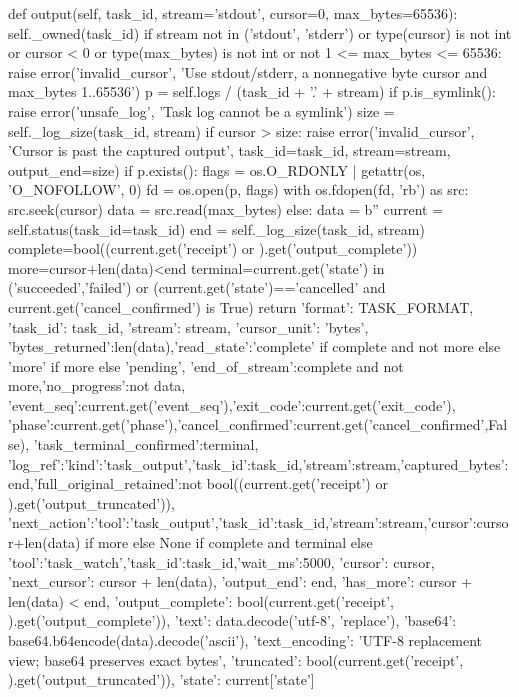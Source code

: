     def output(self, task_id, stream='stdout', cursor=0, max_bytes=65536):
        self._owned(task_id)
        if stream not in ('stdout', 'stderr') or type(cursor) is not int or cursor < 0 or type(max_bytes) is not int or not 1 <= max_bytes <= 65536:
            raise error('invalid_cursor', 'Use stdout/stderr, a nonnegative byte cursor and max_bytes 1..65536')
        p = self.logs / (task_id + '.' + stream)
        if p.is_symlink():
            raise error('unsafe_log', 'Task log cannot be a symlink')
        size = self._log_size(task_id, stream)
        if cursor > size:
            raise error('invalid_cursor', 'Cursor is past the captured output', task_id=task_id, stream=stream, output_end=size)
        if p.exists():
            flags = os.O_RDONLY | getattr(os, 'O_NOFOLLOW', 0)
            fd = os.open(p, flags)
            with os.fdopen(fd, 'rb') as src:
                src.seek(cursor)
                data = src.read(max_bytes)
        else:
            data = b''
        current = self.status(task_id=task_id)
        end = self._log_size(task_id, stream)
        complete=bool((current.get('receipt') or {}).get('output_complete'))
        more=cursor+len(data)<end
        terminal=current.get('state') in ('succeeded','failed') or (current.get('state')=='cancelled' and current.get('cancel_confirmed') is True)
        return {'format': TASK_FORMAT, 'task_id': task_id, 'stream': stream, 'cursor_unit': 'bytes',
                'bytes_returned':len(data),'read_state':'complete' if complete and not more else 'more' if more else 'pending',
                'end_of_stream':complete and not more,'no_progress':not data,
                'event_seq':current.get('event_seq'),'exit_code':current.get('exit_code'),
                'phase':current.get('phase'),'cancel_confirmed':current.get('cancel_confirmed',False),
                'task_terminal_confirmed':terminal,
                'log_ref':{'kind':'task_output','task_id':task_id,'stream':stream,'captured_bytes':end,'full_original_retained':not bool((current.get('receipt') or {}).get('output_truncated'))},
                'next_action':{'tool':'task_output','task_id':task_id,'stream':stream,'cursor':cursor+len(data)} if more else None if complete and terminal else {'tool':'task_watch','task_id':task_id,'wait_ms':5000},
                'cursor': cursor, 'next_cursor': cursor + len(data), 'output_end': end,
                'has_more': cursor + len(data) < end,
                'output_complete': bool(current.get('receipt', {}).get('output_complete')),
                'text': data.decode('utf-8', 'replace'), 'base64': base64.b64encode(data).decode('ascii'),
                'text_encoding': 'UTF-8 replacement view; base64 preserves exact bytes',
                'truncated': bool(current.get('receipt', {}).get('output_truncated')), 'state': current['state']}

